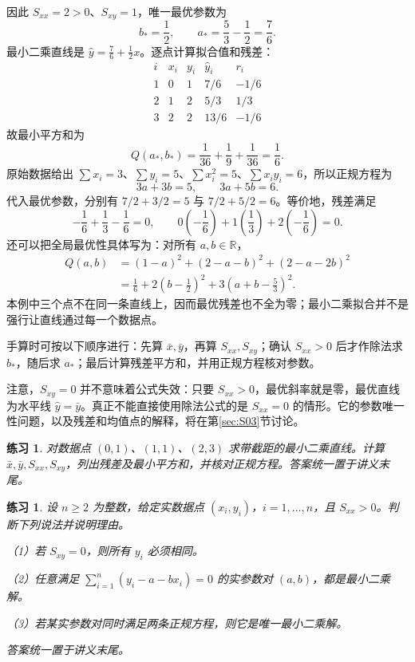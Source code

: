 \documentclass[UTF8,fontset=fandol,11pt]{ctexart}
\newtheorem{exercise}[definition]{练习}
\begin{document}
因此 $S_{xx}=2>0$、$S_{xy}=1$，唯一最优参数为
\[
b_* =\frac12,\qquad a_* =\frac53-\frac12=\frac76.
\]
最小二乘直线是 $\hat{y}=\frac76+\frac12x$。逐点计算拟合值和残差：
\[
\begin{array}{c|r|r|r|r}
i&x_i&y_i&\hat{y}_i&r_i\\ \hline
1&0&1&7/6&-1/6\\
2&1&2&5/3&1/3\\
3&2&2&13/6&-1/6
\end{array}
\]
故最小平方和为
\[
Q(a_*,b_*)=\frac1{36}+\frac19+\frac1{36}=\frac16.
\]
原始数据给出 $\sum x_i=3$、$\sum y_i=5$、$\sum x_i^2=5$、$\sum x_i y_i=6$，所以正规方程为
\[
3a+3b=5,\qquad 3a+5b=6.
\]
代入最优参数，分别有 $7/2+3/2=5$ 与 $7/2+5/2=6$。等价地，残差满足
\[
-\frac16+\frac13-\frac16=0,\qquad
0\left(-\frac16\right)+1\left(\frac13\right)+2\left(-\frac16\right)=0.
\]
还可以把全局最优性具体写为：对所有 $a,b\in\mathbb{R}$，
\[
\begin{aligned}
Q(a,b)&=(1-a)^2+(2-a-b)^2+(2-a-2b)^2\\
&=\frac16+2\left(b-\frac12\right)^2+3\left(a+b-\frac53\right)^2.
\end{aligned}
\]
本例中三个点不在同一条直线上，因而最优残差也不全为零；最小二乘拟合并不是强行让直线通过每一个数据点。\par
手算时可按以下顺序进行：先算 $\bar{x},\bar{y}$，再算 $S_{xx},S_{xy}$；确认 $S_{xx}>0$ 后才作除法求 $b_*$，随后求 $a_*$；最后计算残差平方和，并用正规方程核对参数。

注意，$S_{xy}=0$ 并不意味着公式失效：只要 $S_{xx}>0$，最优斜率就是零，最优直线为水平线 $\hat{y}=\bar{y}$。真正不能直接使用除法公式的是 $S_{xx}=0$ 的情形。它的参数唯一性问题，以及残差和均值点的解释，将在第\ref{sec:S03}节讨论。\par
\begin{exercise}
\label{mathagent:exercise:332ae2e99c79cf97370ba4732967ff23f2a2c4a4b36b98eda8e910755bf43b8b}
对数据点 $(0,1)$、$(1,1)$、$(2,3)$ 求带截距的最小二乘直线。计算 $\bar{x},\bar{y},S_{xx},S_{xy}$，列出残差及最小平方和，并核对正规方程。答案统一置于讲义末尾。
\end{exercise}
\begin{exercise}
\label{mathagent:exercise:b4c9c9a1fb82bcef052fdbf6e1539831ed88cee016dbcbf83a50e5e8d2311be0}
设 $n\geq2$ 为整数，给定实数据点 $(x_i,y_i)$，$i=1,\ldots,n$，且 $S_{xx}>0$。判断下列说法并说明理由。

（1）若 $S_{xy}=0$，则所有 $y_i$ 必须相同。

（2）任意满足 $\sum_{i=1}^{n}(y_i-a-bx_i)=0$ 的实参数对 $(a,b)$，都是最小二乘解。

（3）若某实参数对同时满足两条正规方程，则它是唯一最小二乘解。

答案统一置于讲义末尾。
\end{exercise}
\end{document}
